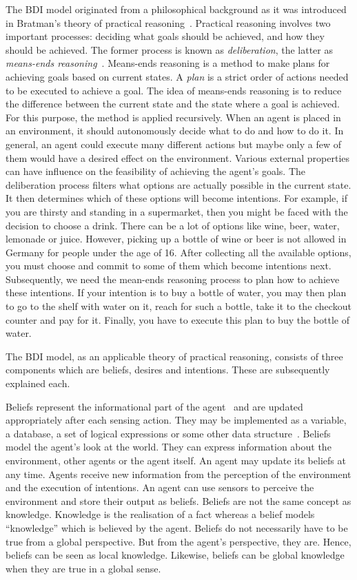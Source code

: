 The BDI model originated from a philosophical background as it was introduced in Bratman's theory of practical reasoning~\cite{Sebastian_Hierarchical_2006}.
Practical reasoning involves two important processes: deciding what goals should be achieved, and how they should be achieved.
The former process is known as \emph{deliberation}, the latter as \emph{means-ends reasoning}~\cite{Gerhard_MultiSystem_1999}.
Means-ends reasoning is a method to make plans for achieving goals based on current states.
A \emph{plan} is a strict order of actions needed to be executed to achieve a goal.
The idea of means-ends reasoning is to reduce the difference between the current state and the state where a goal is achieved.
For this purpose, the method is applied recursively.
When an agent is placed in an environment, it should autonomously decide what to do and how to do it.
In general, an agent could execute many different actions but maybe only a few of them would have a desired effect on the environment.
Various external properties can have influence on the feasibility of achieving the agent's goals.
The deliberation process filters what options are actually possible in the current state.
It then determines which of these options will become intentions.
For example, if you are thirsty and standing in a supermarket, then you might be faced with the decision to choose a drink.
There can be a lot of options like wine, beer, water, lemonade or juice.
However, picking up a bottle of wine or beer is not allowed in Germany for people under the age of 16. %
After collecting all the available options, you must choose and commit to some of them which become intentions next.
Subsequently, we need the mean-ends reasoning process to plan how to achieve these intentions.
If your intention is to buy a bottle of water, you may then plan to go to the shelf with water on it, reach for such a bottle, take it to the checkout counter and pay for it.
Finally, you have to execute this plan to buy the bottle of water.

The BDI model, as an applicable theory of practical reasoning, consists of three components which are beliefs, desires and intentions.
These are subsequently explained each.

Beliefs represent the informational part of the agent~\cite{Rao_BDITheory_1995} and are updated appropriately after each sensing action.
They may be implemented as a variable, a database, a set of logical expressions or some other data structure~\cite{Rao_BDITheory_1995}.
Beliefs model the agent's look at the world.
They can express information about the environment, other agents or the agent itself.
An agent may update its beliefs at any time.
Agents receive new information from the perception of the environment and the execution of intentions.
An agent can use sensors to perceive the environment and store their output as beliefs.
Beliefs are not the same concept as knowledge.
Knowledge is the realisation of a fact whereas a belief models \enquote{knowledge} which is believed by the agent.
Beliefs do not necessarily have to be true from a global perspective.
But from the agent's perspective, they are.
Hence, beliefs can be seen as local knowledge.
Likewise, beliefs can be global knowledge when they are true in a global sense.

